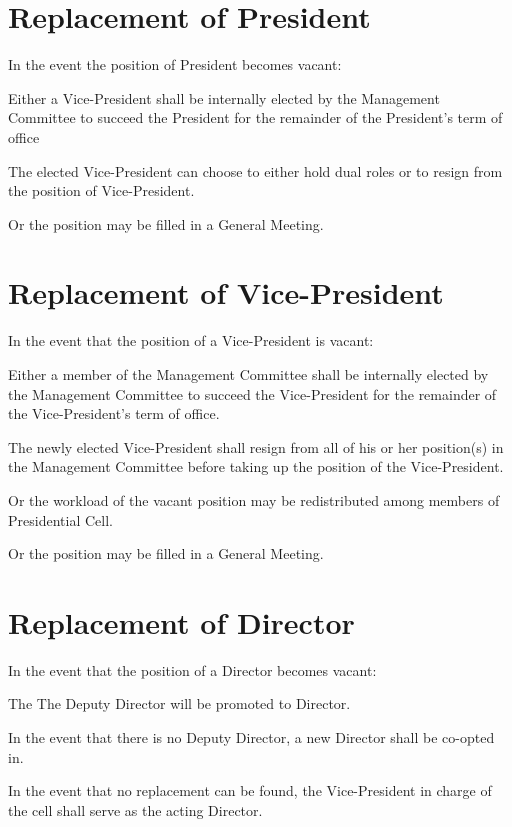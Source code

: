 \section{Replacement of President}
In the event the position of President becomes vacant:
	\begin{legal}
	\item Either a Vice-President shall be internally elected by the Management Committee to succeed the President for the remainder of the President's term of office
		\begin{legal}
		\item The elected Vice-President can choose to either hold dual roles or to resign from the position of Vice-President.
		\end{legal}
	\item Or the position may be filled in a General Meeting.
	\end{legal}

\section{Replacement of Vice-President}
In the event that the position of a Vice-President is vacant:
	\begin{legal}
	\item Either a member of the Management Committee shall be internally elected by the Management Committee to succeed the Vice-President for the remainder of the Vice-President's term of office.
	\begin{legal}
		\item The newly elected Vice-President shall resign from all of his or her position(s) in the Management Committee before taking up the position of the Vice-President.
	\end{legal}
	\item Or the workload of the vacant position may be redistributed among members of Presidential Cell.
	\item Or the position may be filled in a General Meeting.
	\end{legal}

\section{Replacement of Director}
In the event that the position of a Director becomes vacant:
	\begin{legal}
	\item The The Deputy Director will be promoted to Director.
	\item In the event that there is no Deputy Director, a new Director shall be co-opted in.
	\item In the event that no replacement can be found, the Vice-President in charge of the cell shall serve as the acting Director.
	\end{legal}

